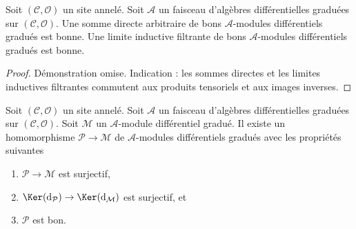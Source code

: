 \begin{lemma}
\label{lemma-good-direct-sum} Soit
$(\mathcal{C}, \mathcal{O})$ un site annelé. Soit
$\mathcal{A}$ un faisceau d'algèbres différentielles graduées sur
$(\mathcal{C}, \mathcal{O})$. Une somme directe
arbitraire de bons $\mathcal{A}$-modules différentiels gradués est
bonne. Une limite inductive filtrante de bons
$\mathcal{A}$-modules différentiels gradués est bonne.
\end{lemma}

\begin{proof}
Démonstration omise. Indication : les sommes directes et les limites inductives
filtrantes commutent aux produits tensoriels et aux images inverses.
\end{proof}

\begin{lemma}
\label{lemma-good-quotient}
Soit $(\mathcal{C}, \mathcal{O})$ un site annelé.
Soit $\mathcal{A}$ un faisceau d'algèbres différentielles graduées
sur $(\mathcal{C}, \mathcal{O})$. Soit $\mathcal{M}$
un $\mathcal{A}$-module différentiel gradué. Il existe un homomorphisme
$\mathcal{P} \to \mathcal{M}$ de $\mathcal{A}$-modules différentiels gradués
avec les propriétés suivantes
\begin{enumerate}
\item $\mathcal{P} \to \mathcal{M}$ est surjectif,
\item $\Ker(\text{d}_\mathcal{P}) \to \Ker(\text{d}_\mathcal{M})$
est surjectif, et
\item $\mathcal{P}$ est bon.
\end{enumerate}
\end{lemma}

